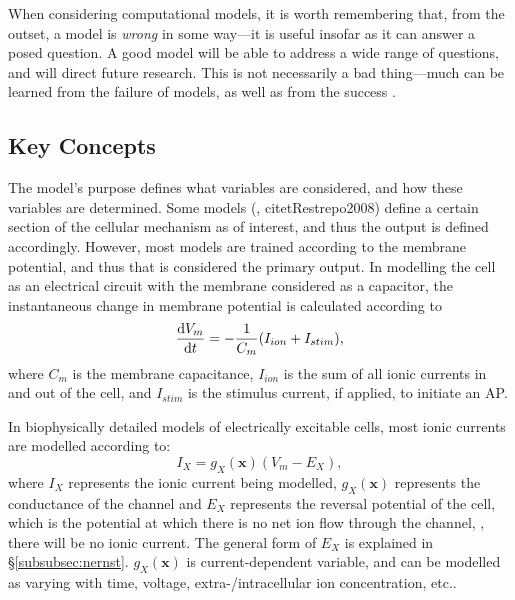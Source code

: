\documentclass[../thesis-main.tex]{subfiles}
\begin{document}
 When considering computational models, it is worth remembering that, from the outset, a model is \emph{wrong} in some way---it is useful insofar as it can answer a posed question. A good model will be able to address a wide range of questions, and will direct future research. This is not necessarily a bad thing---much can be learned from the failure of models, as well as from the success \citep{Noble2001}.
 
 \subsection{Key Concepts}
 \label{subsec:model-concepts}
 The model's purpose defines what variables are considered, and how these variables are determined. Some models (\eg, citet{Restrepo2008}) define a certain section of the cellular mechanism as of interest, and thus the output is defined accordingly. However, most models are trained according to the membrane potential, and thus that is considered the primary output. In modelling the cell as an electrical circuit with the membrane considered as a capacitor, the instantaneous change in membrane potential is calculated according to
 \begin{equation}
  \frac{\textnormal{d}V_m}{\textnormal{d}t} = -\frac{1}{C_m}(I_{ion}+I_{stim}),
 \end{equation}
 where $C_m$ is the membrane capacitance, $I_{ion}$ is the sum of all ionic currents in and out of the cell, and $I_{stim}$ is the stimulus current, if applied, to initiate an AP.
 
 In biophysically detailed models of electrically excitable cells, most ionic currents are modelled according to:
 \begin{equation}
  I_X = g_X(\mathbf{x})(V_m-E_X),
 \end{equation}
 where $I_X$ represents the ionic current being modelled, $g_X(\mathbf{x})$ represents the conductance of the channel and $E_X$ represents the reversal potential of the cell, which is the potential at which there is no net ion flow through the channel, \idest, there will be no ionic current. The general form of $E_X$ is explained in \S\ref{subsubsec:nernst}. $g_X(\mathbf{x})$ is current-dependent variable, and can be modelled as varying with time, voltage, extra-/intracellular ion concentration, etc..
 
\end{document}
